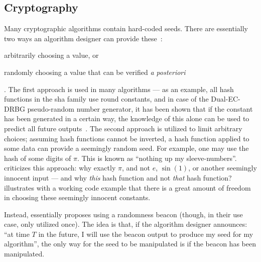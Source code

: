 \subsection{Cryptography}\label{subsec:usecase_cryptography}
Many cryptographic algorithms contain hard-coded seeds.
There are essentially two ways an algorithm designer can provide these~\cite{baigneres2015trap}:
\begin{enumberate*}
    \item arbitrarily choosing a value, or
    \item randomly choosing a value that can be verified \emph{a posteriori}
\end{enumberate*}.
The first approach is used in many algorithms --- as an example, all hash functions in the \gls{sha} family use round constants, and in case of the Dual-EC-DRBG pseudo-random number generator, it has been shown that if the constant has been generated in a certain way, the knowledge of this alone can be used to predict all future outputs~\cite{dualec-paper}.
The second approach is utilized to limit arbitrary choices; assuming hash functions cannot be inverted, a hash function applied to some data can provide a seemingly random seed.
For example, one may use the hash of some digits of $\pi$. This is known as \enquote{nothing up my sleeve-numbers}.
\citet{bernstein2015manipulate} criticizes this approach: why exactly $\pi$, and not $e$, $\sin(1)$, or another seemingly innocent input --- and why \emph{this} hash function and not \emph{that} hash function?
\citet{backdoorsupmysleeve} illustrates with a working code example that there is a great amount of freedom in choosing these seemingly innocent constants.

Instead, \citet{baigneres2015trap} essentially proposes using a randomness beacon (though, in their use case, only utilized once).
The idea is that, if the algorithm designer announces: \enquote{at time $T$ in the future, I will use the beacon output to produce my seed for my algorithm}, the only way for the seed to be manipulated is if the beacon has been manipulated.
